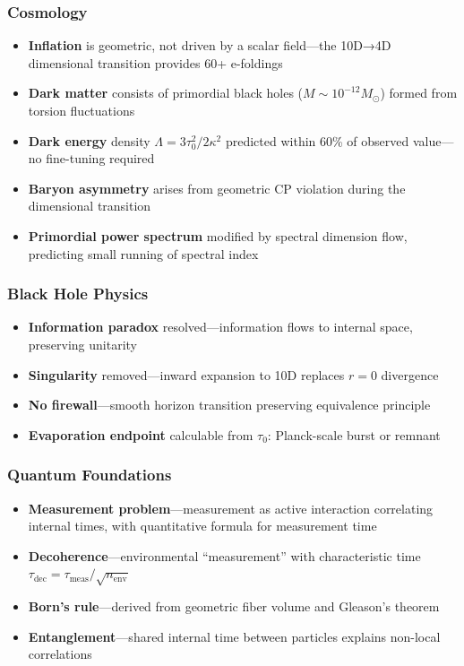 \subsubsection{Cosmology}

\begin{itemize}
    \item \textbf{Inflation} is geometric, not driven by a scalar field—the 10D→4D dimensional transition provides 60+ e-foldings
    \item \textbf{Dark matter} consists of primordial black holes ($M \sim 10^{-12} M_\odot$) formed from torsion fluctuations
    \item \textbf{Dark energy} density $\Lambda = 3\tau_0^2/2\kappa^2$ predicted within 60\% of observed value—no fine-tuning required
    \item \textbf{Baryon asymmetry} arises from geometric CP violation during the dimensional transition
    \item \textbf{Primordial power spectrum} modified by spectral dimension flow, predicting small running of spectral index
\end{itemize}

\subsubsection{Black Hole Physics}

\begin{itemize}
    \item \textbf{Information paradox} resolved—information flows to internal space, preserving unitarity
    \item \textbf{Singularity} removed—inward expansion to 10D replaces $r=0$ divergence
    \item \textbf{No firewall}—smooth horizon transition preserving equivalence principle
    \item \textbf{Evaporation endpoint} calculable from $\tau_0$: Planck-scale burst or remnant
\end{itemize}

\subsubsection{Quantum Foundations}

\begin{itemize}
    \item \textbf{Measurement problem}—measurement as active interaction correlating internal times, with quantitative formula for measurement time
    \item \textbf{Decoherence}—environmental ``measurement'' with characteristic time $\tau_{\text{dec}} = \tau_{\text{meas}}/\sqrt{n_{\text{env}}}$
    \item \textbf{Born's rule}—derived from geometric fiber volume and Gleason's theorem
    \item \textbf{Entanglement}—shared internal time between particles explains non-local correlations
\end{itemize}

